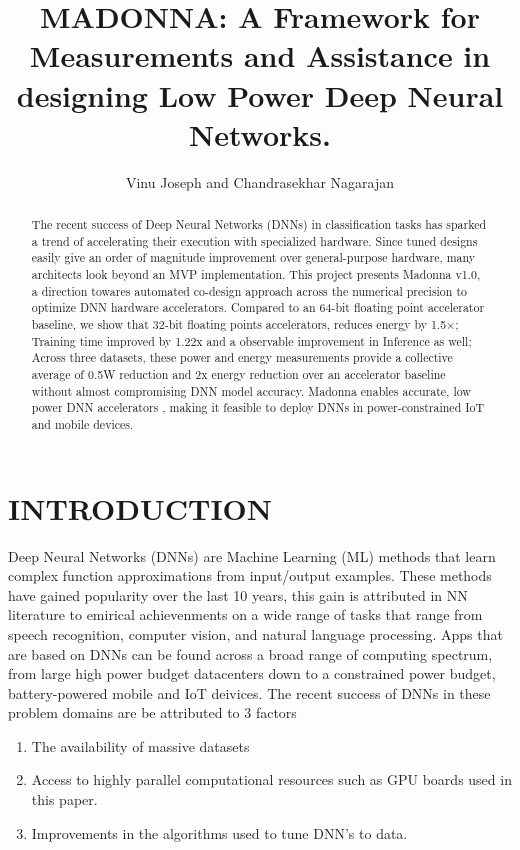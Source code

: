 \documentclass[letterpaper, 10 pt, conference]{ieeeconf}
\title{
\LARGE \textbf{MADONNA}: A Framework for \textbf{M}easurements and \textbf{A}ssistance \newline in designing Low Power \textbf{D}eep \textbf{N}eural \textbf{N}etworks.
}
\author{Vinu Joseph and Chandrasekhar Nagarajan}
\begin{document}
\maketitle
\thispagestyle{empty}
\pagestyle{empty}

\begin{abstract}

The recent success of Deep Neural Networks (DNNs) in
classification tasks has sparked a trend of accelerating their
execution with specialized hardware. 
Since tuned designs easily give an order of magnitude improvement over
general-purpose hardware, many architects look beyond an MVP implementation.
This project presents Madonna v1.0, a direction towares automated
co-design approach across the numerical precision 
to optimize DNN hardware accelerators.
Compared to an 64-bit floating point accelerator
baseline, we show that 32-bit floating points accelerators, reduces energy by 1.5×;
Training time improved by 1.22x and a observable improvement in Inference as well;
Across three datasets, these power and energy measurements provide a collective average
of 0.5W reduction and 2x energy reduction over an accelerator baseline
without almost compromising DNN model accuracy. 
Madonna enables accurate, low power DNN accelerators , making it feasible to deploy
DNNs in power-constrained IoT and mobile devices.  

\end{abstract}


\section{INTRODUCTION}
Deep Neural Networks (DNNs) are Machine Learning (ML) methods that learn
complex function approximations from input/output examples.
These methods have gained popularity over the last 10 years, this gain
is attributed in NN literature to emirical achievenments on a wide range
of tasks that range from speech recognition, computer vision, and natural language processing. Apps that are based on DNNs can be found across
a broad range of computing spectrum, from large high power budget datacenters
down to a constrained power budget, battery-powered mobile and IoT deivices.
The recent success of DNNs in these problem domains are be attributed to 3 factors
\begin{enumerate}
  \item The availability of massive datasets
  \item Access to highly parallel computational resources such as GPU boards used in this paper.
  \item Improvements in the algorithms used to tune DNN's to data.
\end{enumerate}
\end{document}
